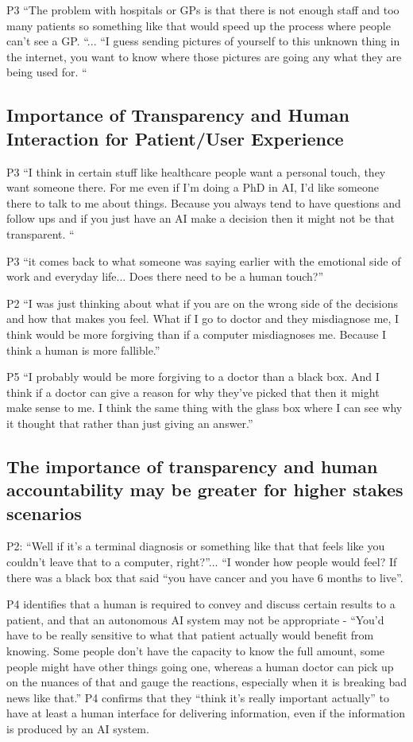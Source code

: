 \documentclass[manuscript,screen,review]{acmart}
\begin{document}
P3 “The problem with hospitals or GPs is that there is not enough staff and too many patients so something like that would speed up the process where people can’t see a GP. “... “I guess sending pictures of yourself to this unknown thing in the internet, you want to know where those pictures are going any what they are being used for. “

\subsection{Importance of Transparency and Human Interaction for Patient/User Experience}
P3 “I think in certain stuff like healthcare people want a personal touch, they want someone there. For me even if I'm doing a PhD in AI, I'd like someone there to talk to me about things. Because you always tend to have questions and follow ups and if you just have an AI make a decision then it might not be that transparent. “

P3 “it comes back to what someone was saying earlier with the emotional side of work and everyday life... Does there need to be a human touch?”

P2 “I was just thinking about what if you are on the wrong side of the decisions and how that makes you feel. What if I go to doctor and they misdiagnose me, I think would be more forgiving than if a computer misdiagnoses me. Because I think a human is more fallible.”

P5 “I probably would be more forgiving to a doctor than a black box. And I think if a doctor can give a reason for why they’ve picked that then it might make sense to me. I think the same thing with the glass box where I can see why it thought that rather than just giving an answer.”

\subsection{The importance of transparency and human accountability may be greater for higher stakes scenarios}

P2: “Well if it’s a terminal diagnosis or something like that that feels like you couldn’t leave that to a computer, right?”... “I wonder how people would feel? If there was a black box that said “you have cancer and you have 6 months to live”. 

P4 identifies that a human is required to convey and discuss certain results to a patient, and that an autonomous AI system may not be appropriate - “You’d have to be really sensitive to what that patient actually would benefit from knowing. Some people don’t have the capacity to know the full amount, some people might have other things going one, whereas a human doctor can pick up on the nuances of that and gauge the reactions, especially when it is breaking bad news like that.” P4 confirms that they “think it’s really important actually” to have at least a human interface for delivering information, even if the information is produced by an AI system. 
\end{document}

